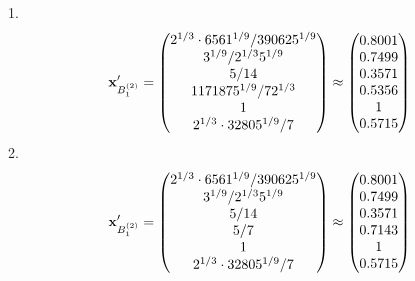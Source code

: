 \documentclass[10pt,a4paper]{article}
\begin{document}
	1.
	\[
		\bold{x}'_{B_1^{(2)}} = 
		\begin{pmatrix}
			{{2^ {1 / 3}} \cdot {6561^ {1 / 9}}} / {{390625^ {1 / 9}}} \\
			{{3^ {1 / 9}}} / {{2^ {1 / 3}}{5^ {1 / 9}}} \\
			{{5}} / {{14}} \\
			{{1171875^ {1 / 9}}} / {{7}{2^ {1 / 3}}} \\
			{1}{} \\
			{{2^ {1 / 3}} \cdot {32805^ {1 / 9}}} / {{7}} \\
		\end{pmatrix}
		\approx
		\begin{pmatrix}
			0.8001   \\
			0.7499   \\
			0.3571   \\
			0.5356   \\
			1        \\
			0.5715   \\
		\end{pmatrix}
	\]
	2.
	\[
		\bold{x}'_{B_1^{(2)}} = 
		\begin{pmatrix}
			{{2^ {1 / 3}} \cdot {6561^ {1 / 9}}} / {{390625^ {1 / 9}}} \\
			{{3^ {1 / 9}}} / {{2^ {1 / 3}}{5^ {1 / 9}}} \\
			{{5}} / {{14}} \\
			{{5}} / {{7}} \\
			{1}{} \\
			{{2^ {1 / 3}} \cdot {32805^ {1 / 9}}} / {{7}} \\
		\end{pmatrix}
		\approx
		\begin{pmatrix}
			0.8001   \\
			0.7499   \\
			0.3571   \\
			0.7143   \\
			1        \\
			0.5715   \\
		\end{pmatrix}
	\]
\end{document}
